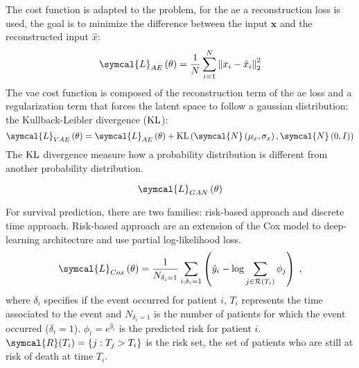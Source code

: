 \documentclass[../main.tex]{subfiles}
\begin{document}
     The cost function is adapted to the problem, for the \gls{ae} a reconstruction loss is used, the goal is to minimize the difference between the input \(\symbf{x}\) and the reconstructed input \(\hat{x}\):
     \begin{equation}
         \symcal{L}_{AE}\left(\theta\right) = \frac{1}{N}\sum_{i=1}^{N} {\left\|x_i - \hat{x}_i \right\|}_2^{2}
     \end{equation}
     The \gls{vae} cost function is composed of the reconstruction term of the \gls{ae} loss and a regularization term that forces the latent space to follow a gaussian distribution: the Kullback-Leibler divergence (\(\operatorname{KL}\)):
     \begin{equation}
         \symcal{L}_{VAE}\left(\theta\right) = \symcal{L}_{AE}\left(\theta\right) + \KL\left(\symcal{N}\left(\mu_{x}, \sigma_{x}\right), \symcal{N}\left(0, I\right)\right)
     \end{equation}
     The \(\operatorname{KL}\) divergence measure how a probability distribution is different from another probability distribution.

     \begin{equation}
         \symcal{L}_{GAN}\left(\theta\right)
     \end{equation}

     For survival prediction, there are two families: risk-based approach and discrete time approach.
     Risk-based approach are an extension of the Cox model to deep-learning architecture and use partial log-likelihood loss.
     \begin{equation}
         \symcal{L}_{Cox}\left(\theta\right) = \frac{1}{N_{\delta_i = 1}} \sum_{i:\delta_i=1} \left(\hat{y}_i - \log \sum_{j \in \mathcal{R}(T_i)}\phi_j \right)\; \text{,}
     \end{equation}
     where \(\delta_i\) specifies if the event occurred for patient \(i\), \(T_i\) represents the time associated to the event and \(N_{\delta_i = 1}\) is the number of patients for which the event occurred (\(\delta_i = 1\)).
     \(\phi_i = e^{\hat{y}_i}\) is the predicted risk for patient \(i\).
     \(\symcal{R}(T_i) = \{j: T_j > T_i\}\) is the risk set, the set of patients who are still at risk of death at time \(T_i\).
\end{document}

